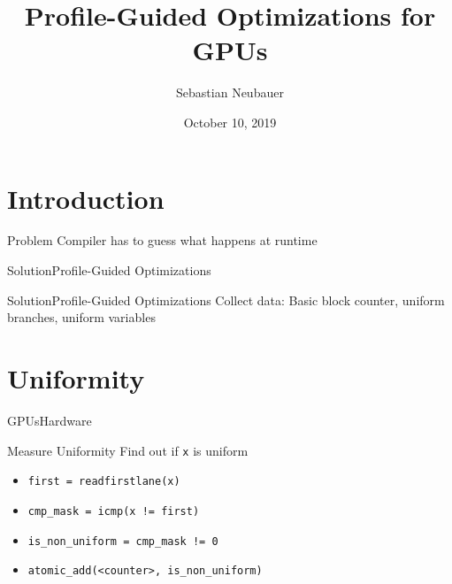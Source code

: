 \documentclass[xcolor={usenames,dvipsnames}, aspectratio=169, 12pt]{beamer}
\title[Master Thesis]{Profile-Guided Optimizations for GPUs}
\author[S. Neubauer]{Sebastian Neubauer}
\date{October 10, 2019}
\institute{Technische Universität München}
\begin{document}
\frame[plain]{\titlepage}

\section{Introduction}

\begin{frame}{Problem}
\large Compiler has to guess what happens at runtime
\end{frame}

\begin{frame}{Solution}{Profile-Guided Optimizations}
\centering

\end{frame}

\begin{frame}{Solution}{Profile-Guided Optimizations}
Collect data: Basic block counter, uniform branches, uniform variables
\end{frame}

\section{Uniformity}

\begin{frame}[fragile]{GPUs}{Hardware}
\begin{center}

\end{center}

\end{frame}

\begin{frame}[fragile]{GPUs}{Software}
Assembler}]{figures/assembly.asm}
\end{frame}

\begin{frame}{Measure Uniformity}
Find out if \texttt{x} is uniform
\begin{itemize}
	\item \texttt{first = readfirstlane(x)}
	\item \texttt{cmp\_mask = icmp(x != first)}
	\item \texttt{is\_non\_uniform = cmp\_mask != 0}
	\item \texttt{atomic\_add(<counter>, is\_non\_uniform)}
\end{itemize}
\end{frame}
\end{document}
